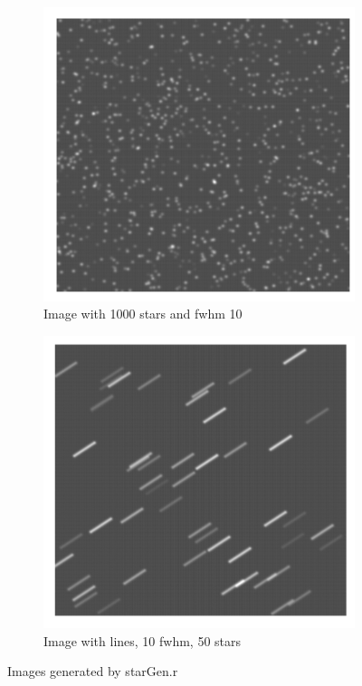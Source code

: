 \begin{figure}[!h]
\centering
\begin{subfigure}{.5\textwidth}
  \centering
  \includegraphics[width=1.0\linewidth]{front_pages/images/original_star_gen.png}
  \caption{Image with 1000 stars and fwhm 10}
  \label{fig:star_gen_orig}
\end{subfigure}%
\begin{subfigure}{.5\textwidth}
  \centering
  \includegraphics[width=1.0\linewidth]{front_pages/images/original_star_gen_lines.png}
  \caption{Image with lines, 10 fwhm, 50 stars }
  \label{fig:star_gen_orig_lines}
\end{subfigure}
\caption{Images generated by starGen.r}
\label{fig:star_gen}
\end{figure}

